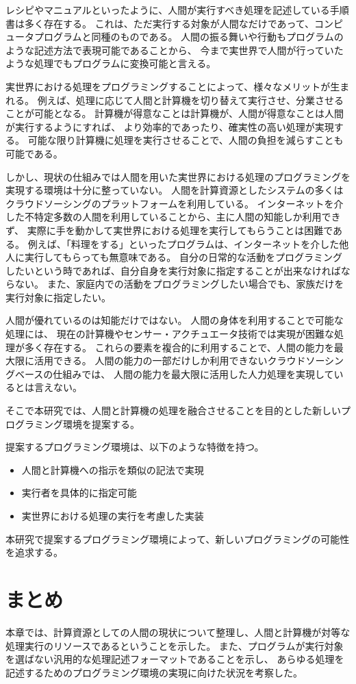 レシピやマニュアルといったように、人間が実行すべき処理を記述している手順書は多く存在する。
これは、ただ実行する対象が人間なだけであって、コンピュータプログラムと同種のものである。
人間の振る舞いや行動もプログラムのような記述方法で表現可能であることから、
今まで実世界で人間が行っていたような処理でもプログラムに変換可能と言える。

実世界における処理をプログラミングすることによって、様々なメリットが生まれる。
例えば、処理に応じて人間と計算機を切り替えて実行させ、分業させることが可能となる。
計算機が得意なことは計算機が、人間が得意なことは人間が実行するようにすれば、
より効率的であったり、確実性の高い処理が実現する。
可能な限り計算機に処理を実行させることで、人間の負担を減らすことも可能である。

しかし、現状の仕組みでは人間を用いた実世界における処理のプログラミングを実現する環境は十分に整っていない。
人間を計算資源としたシステムの多くはクラウドソーシングのプラットフォームを利用している。
インターネットを介した不特定多数の人間を利用していることから、主に人間の知能しか利用できず、
実際に手を動かして実世界における処理を実行してもらうことは困難である。
例えば、「料理をする」といったプログラムは、インターネットを介した他人に実行してもらっても無意味である。
自分の日常的な活動をプログラミングしたいという時であれば、自分自身を実行対象に指定することが出来なければならない。
また、家庭内での活動をプログラミングしたい場合でも、家族だけを実行対象に指定したい。

人間が優れているのは知能だけではない。
人間の身体を利用することで可能な処理には、
現在の計算機やセンサー・アクチュエータ技術では実現が困難な処理が多く存在する。
これらの要素を複合的に利用することで、人間の能力を最大限に活用できる。
人間の能力の一部だけしか利用できないクラウドソーシングベースの仕組みでは、
人間の能力を最大限に活用した人力処理を実現しているとは言えない。

そこで本研究では、人間と計算機の処理を融合させることを目的とした新しいプログラミング環境を提案する。

提案するプログラミング環境は、以下のような特徴を持つ。

\begin{itemize}
\itemsep1pt\parskip0pt
\item
  人間と計算機への指示を類似の記法で実現
\item
  実行者を具体的に指定可能
\item
  実世界における処理の実行を考慮した実装
\end{itemize}

本研究で提案するプログラミング環境によって、新しいプログラミングの可能性を追求する。

\section{まとめ}\label{ux307eux3068ux3081}

本章では、計算資源としての人間の現状について整理し、人間と計算機が対等な処理実行のリソースであるということを示した。
また、プログラムが実行対象を選ばない汎用的な処理記述フォーマットであることを示し、
あらゆる処理を記述するためのプログラミング環境の実現に向けた状況を考察した。
